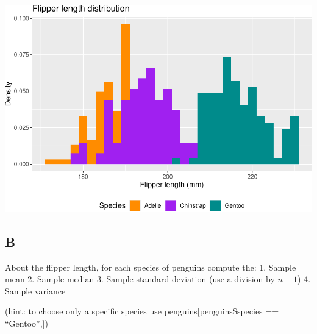\documentclass[
]{article}
\begin{document}
\includegraphics{es_files/figure-latex/unnamed-chunk-9-1.pdf}

\hypertarget{b-2}{%
\subsection{B}\label{b-2}}

About the flipper length, for each species of penguins compute the: 1.
Sample mean 2. Sample median 3. Sample standard deviation (use a
division by \(n-1\)) 4. Sample variance

(hint: to choose only a specific species use
penguins{[}penguins\$species == ``Gentoo'',{]})
\end{document}
